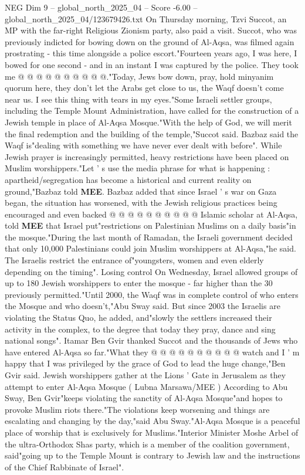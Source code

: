 \begin{textsample}{NEG Dim 9 – global\_north\_2025\_04 – Score -6.00 – global\_north\_2025\_04/123679426.txt}
On Thursday morning, Tzvi Succot, an MP with the far-right Religious Zionism party, also paid a visit.
Succot, who was previously indicted for bowing down on the ground of Al-Aqsa, was filmed again prostrating - this time alongside a police escort."Fourteen years ago, I was here, I bowed for one second - and in an instant I was captured by the police.
They took me @ @ @ @ @ @ @ @ @ @."Today, Jews bow down, pray, hold minyanim quorum here, they don't let the Arabs get close to us, the Waqf doesn't come near us.
I see this thing with tears in my eyes."Some Israeli settler groups, including the Temple Mount Administration, have called for the construction of a Jewish temple in place of Al-Aqsa Mosque."With the help of God, we will merit the final redemption and the building of the temple,"Succot said.
Bazbaz said the Waqf is"dealing with something we have never ever dealt with before".
While Jewish prayer is increasingly permitted, heavy restrictions have been placed on Muslim worshippers."Let ' s use the media phrase for what is happening : apartheid/segregation has become a historical and current reality on ground,"Bazbaz told \textbf{MEE}.
Bazbaz added that since Israel ' s war on Gaza began, the situation has worsened, with the Jewish religious practices being encouraged and even backed @ @ @ @ @ @ @ @ @ @ Islamic scholar at Al-Aqsa, told \textbf{MEE} that Israel put"restrictions on Palestinian Muslims on a daily basis"in the mosque."During the last month of Ramadan, the Israeli government decided that only 10,000 Palestinians could join Muslim worshippers at Al-Aqsa,"he said.
The Israelis restrict the entrance of"youngsters, women and even elderly depending on the timing".
Losing control On Wednesday, Israel allowed groups of up to 180 Jewish worshippers to enter the mosque - far higher than the 30 previously permitted."Until 2000, the Waqf was in complete control of who enters the Mosque and who doesn't,"Abu Sway said.
But since 2003 the Israelis are violating the Status Quo, he added, and"slowly the settlers increased their activity in the complex, to the degree that today they pray, dance and sing national songs".
Itamar Ben Gvir thanked Succot and the thousands of Jews who have entered Al-Aqsa so far."What they @ @ @ @ @ @ @ @ @ @ watch and I ' m happy that I was privileged by the grace of God to lead the huge change,"Ben Gvir said.
Jewish worshippers gather at the Lions ' Gate in Jerusalem as they attempt to enter Al-Aqsa Mosque ( Lubna Marsawa/MEE ) According to Abu Sway, Ben Gvir"keeps violating the sanctity of Al-Aqsa Mosque"and hopes to provoke Muslim riots there."The violations keep worsening and things are escalating and changing by the day,"said Abu Sway."Al-Aqsa Mosque is a peaceful place of worship that is exclusively for Muslims."Interior Minister Moshe Arbel of the ultra-Orthodox Shas party, which is a member of the coalition government, said"going up to the Temple Mount is contrary to Jewish law and the instructions of the Chief Rabbinate of Israel".

\end{textsample}

